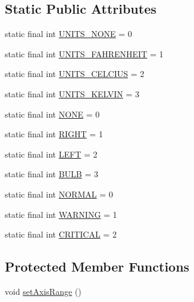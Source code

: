 \subsection*{Static Public Attributes}
\begin{DoxyCompactItemize}
\item 
static final int \mbox{\hyperlink{classorg_1_1jfree_1_1chart_1_1plot_1_1_thermometer_plot_ac84457e7f6d847ecf1659f2387f1e7be}{U\+N\+I\+T\+S\+\_\+\+N\+O\+NE}} = 0
\item 
static final int \mbox{\hyperlink{classorg_1_1jfree_1_1chart_1_1plot_1_1_thermometer_plot_a4000e1bd40b62e1159c32e7b90e92e56}{U\+N\+I\+T\+S\+\_\+\+F\+A\+H\+R\+E\+N\+H\+E\+IT}} = 1
\item 
static final int \mbox{\hyperlink{classorg_1_1jfree_1_1chart_1_1plot_1_1_thermometer_plot_aaac36a74e11fa57e77581d5cc03896b4}{U\+N\+I\+T\+S\+\_\+\+C\+E\+L\+C\+I\+US}} = 2
\item 
static final int \mbox{\hyperlink{classorg_1_1jfree_1_1chart_1_1plot_1_1_thermometer_plot_a3eaea529d20d3035dd08e0aa9a985c75}{U\+N\+I\+T\+S\+\_\+\+K\+E\+L\+V\+IN}} = 3
\item 
static final int \mbox{\hyperlink{classorg_1_1jfree_1_1chart_1_1plot_1_1_thermometer_plot_a5c5c2eaa1e5ec2630b9eb6e7735c4935}{N\+O\+NE}} = 0
\item 
static final int \mbox{\hyperlink{classorg_1_1jfree_1_1chart_1_1plot_1_1_thermometer_plot_a2010a6ea7e1a8a5b523673d169b86a5d}{R\+I\+G\+HT}} = 1
\item 
static final int \mbox{\hyperlink{classorg_1_1jfree_1_1chart_1_1plot_1_1_thermometer_plot_aad7899a73457ebc2310a5df7d51c626a}{L\+E\+FT}} = 2
\item 
static final int \mbox{\hyperlink{classorg_1_1jfree_1_1chart_1_1plot_1_1_thermometer_plot_a703245c7853327fac76511c8f223223c}{B\+U\+LB}} = 3
\item 
static final int \mbox{\hyperlink{classorg_1_1jfree_1_1chart_1_1plot_1_1_thermometer_plot_aba17717e0033f27a793109e7e0b6fd4e}{N\+O\+R\+M\+AL}} = 0
\item 
static final int \mbox{\hyperlink{classorg_1_1jfree_1_1chart_1_1plot_1_1_thermometer_plot_a4de4adda759ff07f06ee846db0bfb445}{W\+A\+R\+N\+I\+NG}} = 1
\item 
static final int \mbox{\hyperlink{classorg_1_1jfree_1_1chart_1_1plot_1_1_thermometer_plot_a6a1a36c4e16f3d12efb53f13bc18d2ef}{C\+R\+I\+T\+I\+C\+AL}} = 2
\end{DoxyCompactItemize}
\subsection*{Protected Member Functions}
\begin{DoxyCompactItemize}
\item 
void \mbox{\hyperlink{classorg_1_1jfree_1_1chart_1_1plot_1_1_thermometer_plot_ae05c6ff862ff76c538e206db8d558832}{set\+Axis\+Range}} ()
\end{DoxyCompactItemize}
